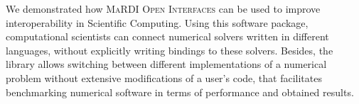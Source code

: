 \documentclass[a0paper, twocolumn, csc, english, final]{mpi2015_poster}
\newcommand{\OIF}{\textsc{MaRDI Open Interfaces}\xspace}
\begin{document}
\begin{poster}
\begin{pcolumn}
\begin{pbox}
\begin{minipage}{\dimexpr0.42\columnwidth - 2\tabcolsep}
      \end{minipage}
    \end{pbox}
    \begin{pbox}
      \large
      We demonstrated how \OIF{} can be used to improve
      interoperability in Scientific Computing.
      Using this software package, computational scientists can connect numerical
      solvers written in different languages, without explicitly writing bindings
      to these solvers.
      Besides, the library allows switching between different implementations
      of a numerical problem without extensive modifications of a user's code,
      that facilitates benchmarking numerical software in terms of performance
      and obtained results.
    \end{pbox}
    \begin{pbox}
      \vspace{1em}
      \printbibliography[]
    \end{pbox}
  \end{pcolumn}
\end{poster}
\end{document}
